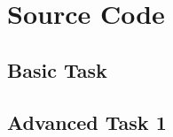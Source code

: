 \renewcommand{\thesection}{Appendix C}
\renewcommand{\thesubsection}{}
\section{Source Code}

\subsection{Basic Task}




\subsection{Advanced Task 1}





